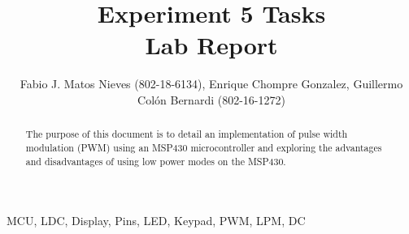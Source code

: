 \documentclass[journal]{IEEEtran}
\begin{document}
\title{Experiment 5 Tasks\\ Lab Report} \author{Fabio J. Matos
  Nieves (802-18-6134), Enrique Chompre Gonzalez, Guillermo Colón Bernardi (802-16-1272)}
\maketitle
\begin{abstract}
  The purpose of this document is to detail an implementation of pulse width modulation (PWM) using an MSP430 microcontroller and exploring the advantages and disadvantages of using low power modes on the MSP430.
\end{abstract}
\begin{IEEEkeywords}
  MCU, LDC, Display, Pins, LED, Keypad, PWM, LPM, DC
\end{IEEEkeywords}
\IEEEpeerreviewmaketitle
\end{document}

